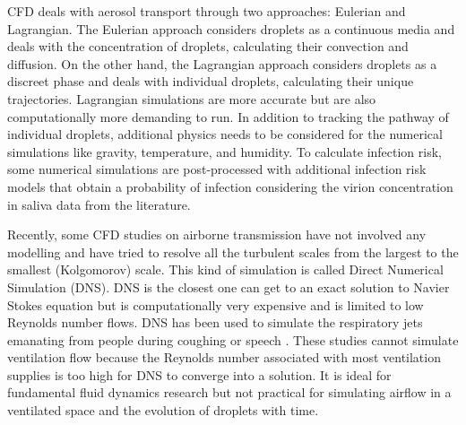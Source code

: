 \documentclass[preprint,12pt]{elsarticle}
\begin{document}
CFD deals with aerosol transport through two approaches: Eulerian and Lagrangian. The Eulerian approach considers droplets as a continuous media and deals with the concentration of droplets, calculating their convection and diffusion. On the other hand, the Lagrangian approach considers droplets as a discreet phase and deals with individual droplets, calculating their unique trajectories. Lagrangian simulations are more accurate but are also computationally more demanding to run. In addition to tracking the pathway of individual droplets, additional physics needs to be considered for the numerical simulations like gravity, temperature, and humidity. To calculate infection risk, some numerical simulations are post-processed with additional infection risk models that obtain a probability of infection considering the virion concentration in saliva data from the literature.

Recently, some CFD studies on airborne transmission have not involved any modelling and have tried to resolve all the turbulent scales from the largest to the smallest (Kolgomorov) scale. This kind of simulation is called Direct Numerical Simulation (DNS). DNS is the closest one can get to an exact solution to Navier Stokes equation but is computationally very expensive and is limited to low Reynolds number flows. DNS has been used to simulate the respiratory jets emanating from people during coughing \cite{rosti2020fluid,diwan2020understanding, chong2021extended} or speech \cite{giri2022colliding, singhal2022virus}. These studies cannot simulate ventilation flow because the Reynolds number associated with most ventilation supplies is too high for DNS to converge into a solution. It is ideal for fundamental fluid dynamics research but not practical for simulating airflow in a ventilated space and the evolution of droplets with time.
\end{document}
